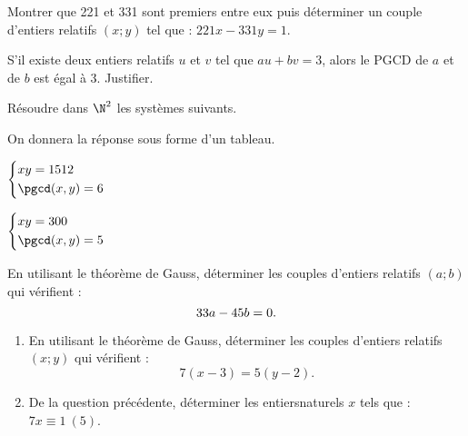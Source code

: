 \begin{colonne*exercice}
\begin{exercice}
  Montrer que 221 et 331 sont premiers entre eux puis déterminer un
  couple d'entiers relatifs $(x;y)$ tel que : $221x - 331y = 1$.
\end{exercice}

\begin{exercice}
  S’il existe deux entiers relatifs $u$ et $v$ tel que $au + bv = 3$,
  alors le PGCD de $a$ et de $b$ est égal à 3. Justifier.
\end{exercice}

\begin{exercice}
  Résoudre dans $\N^2$ les systèmes suivants. 

  On donnera la réponse sous forme d'un tableau.
\begin{colenumerate}{2}
\item $\left\{\begin{aligned}
					&xy=1512\\
					&\pgcd(x,y)=6\end{aligned}\right.$
\item $\left\{\begin{aligned}
					&xy=300\\
					&\pgcd(x,y)=5\end{aligned}\right.$
\end{colenumerate}
\end{exercice}

\columnbreak


\begin{exercice}
En utilisant le théorème de Gauss, déterminer les couples d’entiers relatifs $(a;b)$ qui vérifient :
$$33a - 45b = 0.\vspace{-20pt}$$
\end{exercice}

\begin{exercice}
\begin{enumerate}
\item En utilisant le théorème de Gauss, déterminer les couples d’entiers relatifs $(x;y)$ qui vérifient :
$$7(x-3)=5(y-2).$$
\item De la question précédente, déterminer les entiers\linebreak naturels $x$ tels que : $7x\equiv1~(5)$.
\end{enumerate}
\end{exercice}


\end{colonne*exercice}
